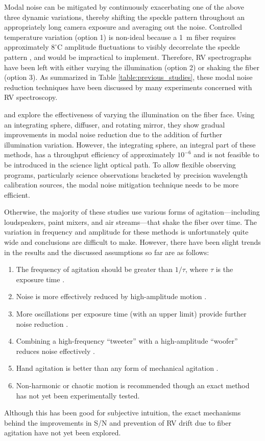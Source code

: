 Modal noise can be mitigated by continuously exacerbating one of the above three dynamic variations, thereby shifting the speckle pattern throughout an appropriately long camera exposure and averaging out the noise. Controlled temperature variation (option 1) is non-ideal because a \SI{1}{\meter} fiber requires approximately $8 ^\circ \mathrm{C}$ amplitude fluctuations to visibly decorrelate the speckle pattern \citep{redding_all-fiber_2013}, and would be impractical to implement. Therefore, RV spectrographs have been left with either varying the illumination (option 2) or shaking the fiber (option 3). As summarized in Table \ref{table:previous_studies}, these modal noise reduction techniques have been discussed by many experiments concerned with RV spectroscopy.

\citet{mahadevan_suppression_2014} and \citet{halverson_habitable-zone_2014} explore the effectiveness of varying the illumination on the fiber face. Using an integrating sphere, diffuser, and rotating mirror, they show gradual improvements in modal noise reduction due to the addition of further illumination variation. However, the integrating sphere, an integral part of these methods, has a throughput efficiency of approximately $10^{-6}$ and is not feasible to be introduced in the science light optical path. To allow flexible observing programs, particularly science observations bracketed by precision wavelength calibration sources, the modal noise mitigation technique needs to be more efficient.

Otherwise, the majority of these studies use various forms of agitation---including loudspeakers, paint mixers, and air streams---that shake the fiber over time. The variation in frequency and amplitude for these methods is unfortunately quite wide and conclusions are difficult to make. However, there have been slight trends in the results and the discussed assumptions so far are as follows:
\begin{enumerate}
\item The frequency of agitation should be greater than $1/\tau$, where $\tau$ is the exposure time \citep{baudrand_modal_2001}.
\item Noise is more effectively reduced by high-amplitude motion \citep{lemke_modal_2011, mccoy_optical_2012}.
\item More oscillations per exposure time (with an upper limit) provide further noise reduction \citep{lemke_modal_2011}.
\item Combining a high-frequency ``tweeter'' with a high-amplitude ``woofer'' reduces noise effectively \citep{plavchan_precision_2013}.
\item Hand agitation is better than any form of mechanical agitation \citep{lemke_modal_2011, mccoy_optical_2012, mahadevan_suppression_2014, roy_scrambling_2014}.
\item Non-harmonic or chaotic motion is recommended \citep{grupp_nature_2003} though an exact method has not yet been experimentally tested.
\end{enumerate}
Although this has been good for subjective intuition, the exact mechanisms behind the improvements in S/N and prevention of RV drift due to fiber agitation have not yet been explored.

